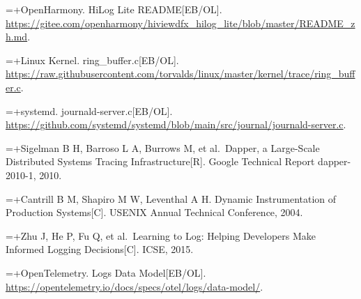 {\noindent\hangindent=\dimexpr\thesisrefnumwd+\thesisrefgap\relax{}\makebox[\thesisrefnumwd][l]{[14]}\nobreak\hspace{\thesisrefgap}OpenHarmony. HiLog Lite README{[}EB/OL{]}. \url{https://gitee.com/openharmony/hiviewdfx_hilog_lite/blob/master/README_zh.md}.\par

\noindent\hangindent=\dimexpr\thesisrefnumwd+\thesisrefgap\relax{}\makebox[\thesisrefnumwd][l]{[15]}\nobreak\hspace{\thesisrefgap}Linux Kernel. ring\_buffer.c{[}EB/OL{]}. \url{https://raw.githubusercontent.com/torvalds/linux/master/kernel/trace/ring_buffer.c}.\par

\noindent\hangindent=\dimexpr\thesisrefnumwd+\thesisrefgap\relax{}\makebox[\thesisrefnumwd][l]{[16]}\nobreak\hspace{\thesisrefgap}systemd. journald-server.c{[}EB/OL{]}. \url{https://github.com/systemd/systemd/blob/main/src/journal/journald-server.c}.\par

\noindent\hangindent=\dimexpr\thesisrefnumwd+\thesisrefgap\relax{}\makebox[\thesisrefnumwd][l]{[17]}\nobreak\hspace{\thesisrefgap}Sigelman B H, Barroso L A, Burrows M, et al.~Dapper, a Large-Scale Distributed Systems Tracing Infrastructure{[}R{]}. Google Technical Report dapper-2010-1, 2010.\par

\noindent\hangindent=\dimexpr\thesisrefnumwd+\thesisrefgap\relax{}\makebox[\thesisrefnumwd][l]{[18]}\nobreak\hspace{\thesisrefgap}Cantrill B M, Shapiro M W, Leventhal A H. Dynamic Instrumentation of Production Systems{[}C{]}. USENIX Annual Technical Conference, 2004.\par

\noindent\hangindent=\dimexpr\thesisrefnumwd+\thesisrefgap\relax{}\makebox[\thesisrefnumwd][l]{[19]}\nobreak\hspace{\thesisrefgap}Zhu J, He P, Fu Q, et al.~Learning to Log: Helping Developers Make Informed Logging Decisions{[}C{]}. ICSE, 2015.\par

\noindent\hangindent=\dimexpr\thesisrefnumwd+\thesisrefgap\relax{}\makebox[\thesisrefnumwd][l]{[20]}\nobreak\hspace{\thesisrefgap}OpenTelemetry. Logs Data Model{[}EB/OL{]}. \url{https://opentelemetry.io/docs/specs/otel/logs/data-model/}.\par

}
